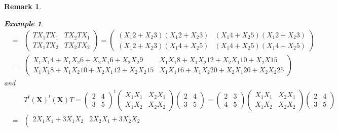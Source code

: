 \documentclass[aps,preprint]{revtex4}
\newtheorem{example}[theorem]{Example}
\newtheorem{remark}[theorem]{Remark}
\begin{document}
\begin{remark}
\begin{enumerate}
\begin{example}
\begin{eqnarray}
&=&\left( 
\begin{array}{cc}
TX_{1}TX_{1} & TX_{2}TX_{1} \\ 
TX_{1}TX_{2} & TX_{2}TX_{2}%
\end{array}%
\right) =\left( 
\begin{array}{cc}
\left( X_{1}2+X_{2}3\right) \left( X_{1}2+X_{2}3\right) & \left(
X_{1}4+X_{2}5\right) \left( X_{1}2+X_{2}3\right) \\ 
\left( X_{1}2+X_{2}3\right) \left( X_{1}4+X_{2}5\right) & \left(
X_{1}4+X_{2}5\right) \left( X_{1}4+X_{2}5\right)%
\end{array}%
\right) \\
&=&\left( 
\begin{array}{cc}
X_{1}X_{1}4+X_{1}X_{2}6+X_{2}X_{1}6+X_{2}X_{2}9 & 
X_{1}X_{1}8+X_{1}X_{2}12+X_{2}X_{1}10+X_{2}X15 \\ 
X_{1}X_{1}8+X_{1}X_{2}10+X_{2}X_{1}12+X_{2}X_{2}15 & 
X_{1}X_{1}16+X_{1}X_{2}20+X_{2}X_{1}20+X_{2}X_{2}25%
\end{array}%
\right)
\end{eqnarray}%
and 
\begin{eqnarray}
&&T^{t}\left( \boldsymbol{X}\right) ^{t}\left( \boldsymbol{X}\right)
T=\left( 
\begin{array}{cc}
2 & 4 \\ 
3 & 5%
\end{array}%
\right) ^{t}\left( 
\begin{array}{cc}
X_{1}X_{1} & X_{2}X_{1} \\ 
X_{1}X_{2} & X_{2}X_{2}%
\end{array}%
\right) \left( 
\begin{array}{cc}
2 & 4 \\ 
3 & 5%
\end{array}%
\right) =\left( 
\begin{array}{cc}
2 & 3 \\ 
4 & 5%
\end{array}%
\right) \left( 
\begin{array}{cc}
X_{1}X_{1} & X_{2}X_{1} \\ 
X_{1}X_{2} & X_{2}X_{2}%
\end{array}%
\right) \left( 
\begin{array}{cc}
2 & 4 \\ 
3 & 5%
\end{array}%
\right) \\
&=&\left( 
\begin{array}{cc}
2X_{1}X_{1}+3X_{1}X_{2} & 2X_{2}X_{1}+3X_{2}X_{2} \\ 

\end{array}
\end{eqnarray}
\end{example}
\end{enumerate}
\end{remark}
\end{document}

